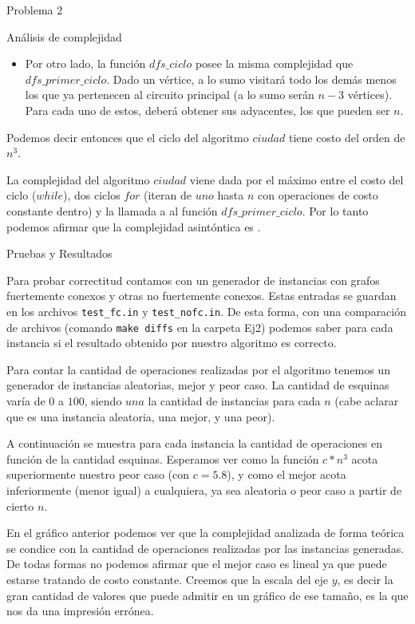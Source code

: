 \begin{section}{Problema 2}
\begin{subsection}{Análisis de complejidad}
\begin{itemize}
\begin{itemize}
			\item Por otro lado, la función $dfs\_ciclo$ posee la misma complejidad que $dfs\_primer\_ciclo$. Dado un vértice, a lo sumo visitará todo los demás menos los que ya pertenecen al circuito principal (a lo sumo serán $n-3$ vértices). Para cada uno de estos, deberá obtener sus adyacentes, los que pueden ser $n$.
			\end{itemize}
		\end{itemize}

		\newpage

		Podemos decir entonces que el ciclo del algoritmo $ciudad$ tiene costo del orden de $n^3$.

		La complejidad del algoritmo $ciudad$ viene dada por el máximo entre el costo del ciclo ($while$), dos ciclos $for$ (iteran de $uno$ hasta $n$ con operaciones de costo constante dentro) y la llamada a al función $dfs\_primer\_ciclo$. Por lo tanto podemos afirmar que la complejidad asintóntica es .
	\end{subsection}

	\newpage

	\begin{subsection}{Pruebas y Resultados}
	
		Para probar correctitud contamos con un generador de instancias con grafos fuertemente conexos y otras no fuertemente conexos. Estas entradas se guardan en los archivos \texttt{test\_fc.in} y  \texttt{test\_nofc.in}. De esta forma, con una comparación de archivos (comando \texttt{make diffs} en la carpeta Ej2) podemos saber para cada instancia si el resultado obtenido por nuestro algoritmo es correcto.

		Para contar la cantidad de operaciones realizadas por el algoritmo tenemos un generador de instancias aleatorias, mejor y peor caso. La cantidad de esquinas varía de $0$ a $100$, siendo $una$ la cantidad de instancias para cada $n$ (cabe aclarar que es una instancia aleatoria, una mejor, y una peor).

		A continuación se muestra para cada instancia la cantidad de operaciones en función de la cantidad esquinas. Esperamos ver como la función $c*n^3$ acota superiormente nuestro peor caso (con $c=5.8$), y como el mejor acota inferiormente (menor igual) a cualquiera, ya sea aleatoria o peor caso a partir de cierto $n$.


		En el gráfico anterior podemos ver que la complejidad analizada de forma teórica se condice con la cantidad de operaciones realizadas por las instancias generadas. De todas formas no podemos afirmar que el mejor caso es lineal ya que puede estarse tratando de costo constante. Creemos que la escala del eje $y$, es decir la gran cantidad de valores que puede admitir en un gráfico de ese tamaño, es la que nos da una impresión errónea.


\end{subsection}
\end{section}
